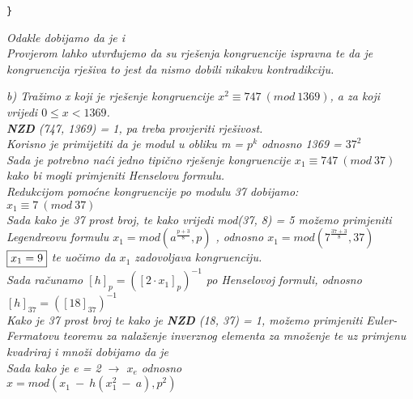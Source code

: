 \documentclass[12pt]{article}
\begin{document}
\begin{enumerate}
\begin{center}
\begin{lstlisting}
}

        \end{lstlisting}
        \textit{Odakle dobijamo da je  i \\ \vspace{0.25cm}Provjerom lahko utvrđujemo da su rješenja kongruencije ispravna te da je kongruencija rješiva to jest da nismo dobili nikakvu kontradikciju.\\}
        \vspace{0.75cm}
        
        
        \textit{b) Tražimo x koji je rješenje kongruencije $x^2 \equiv 747\ (mod\ 1369)$, a za koji vrijedi $0 \leq x < 1369$.\\\textbf{NZD} (747, 1369) = 1, pa treba provjeriti rješivost. \\Korisno je primijetiti da je modul u obliku m = $p^k$ odnosno 1369 = $37^2$}\\
         \vspace*{0.75cm}
         \textit{Sada je potrebno naći jedno tipično rješenje kongruencije $x_1 \equiv 747 \ (mod\ 37)$ kako bi mogli primjeniti Henselovu formulu.}\\ 
         \textit{Redukcijom pomoćne kongruencije po modulu 37 dobijamo: \\ $x_1 \equiv 7 \ (mod\ 37)$\\ Sada kako je 37 prost broj, te kako vrijedi mod(37, 8) = 5 možemo primjeniti Legendreovu formulu $x_1 = mod(a^{\frac{p+3}{8}}, p)$ , odnosno $x_1 = mod(7^{\frac{37+3}{8}}, 37)$\\ \vspace{0.25cm} $\fbox{$x_1 = 9$}$ te uočimo da $x_1$ zadovoljava kongruenciju.\\}
                  \vspace*{0.25cm}
        \textit{Sada računamo $[h]_p = ([2 \cdot x_1]_p)^{-1}$ po Henselovoj formuli, odnosno $[h]_{37} = ([18]_{37})^{-1}$\\Kako je 37 prost broj te kako je \textbf{NZD} (18, 37) = 1, možemo primjeniti Euler-Fermatovu teoremu za nalaženje inverznog elementa za množenje te uz primjenu kvadriraj i množi dobijamo da je \\}
        \vspace{0.25cm}
        \textit{Sada kako je e = 2 $\rightarrow$ $x_e$ odnosno\\ $x = mod(x_1 \ - \ h(x_1^2 \ - \ a), p^2)$\\
        }
    

\end{center}
\end{enumerate}
\end{document}
